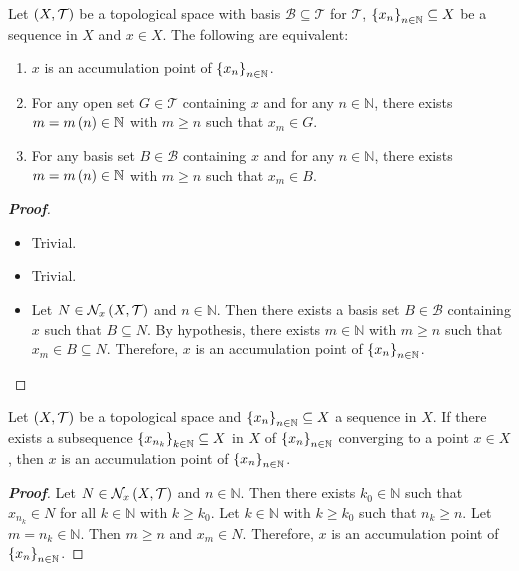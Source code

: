 \begin{proposition}
  Let $\left(X,\mathcal{T}\right)$ be a topological space with basis $\mathcal{B}\subseteq\mathcal{T}$ for $\mathcal{T}$, $\left\{x_n\right\}_{n\in\mathbb{N}}\subseteq X$ be a sequence in $X$ and $x\in X$. The following are equivalent:

  \begin{enumerate}
    \item $x$ is an accumulation point of $\left\{x_n\right\}_{n\in\mathbb{N}}$.
    \item For any open set $G\in\mathcal{T}$ containing $x$ and for any $n\in\mathbb{N}$, there exists $m=m\left(n\right)\in\mathbb{N}$ with $m\geq n$ such that $x_m\in G$.
    \item For any basis set $B\in\mathcal{B}$ containing $x$ and for any $n\in\mathbb{N}$, there exists $m=m\left(n\right)\in\mathbb{N}$ with $m\geq n$ such that $x_m\in B$.
  \end{enumerate}
  \begin{proof}[\rm\textbf{Proof}]
    \hfill
    \begin{itemize}
      \item[\boxed{1\Rightarrow2}] Trivial.
      \item[\boxed{2\Rightarrow3}] Trivial.
      \item[\boxed{3\Rightarrow1}] Let $N\in\mathcal{N}_x\left(X,\mathcal{T}\right)$ and $n\in\mathbb{N}$. Then there exists a basis set $B\in\mathcal{B}$ containing $x$ such that $B\subseteq N$. By hypothesis, there exists $m\in\mathbb{N}$ with $m\geq n$ such that $x_m\in B\subseteq N$. Therefore, $x$ is an accumulation point of $\left\{x_n\right\}_{n\in\mathbb{N}}$.
    \end{itemize}
  \end{proof}
\end{proposition}

\begin{proposition}
  Let $\left(X,\mathcal{T}\right)$ be a topological space and $\left\{x_n\right\}_{n\in\mathbb{N}}\subseteq X$ a sequence in $X$. If there exists a subsequence $\left\{x_{n_k}\right\}_{k\in\mathbb{N}}\subseteq X$ in $X$ of $\left\{x_n\right\}_{n\in\mathbb{N}}$ converging to a point $x\in X$, then $x$ is an accumulation point of $\left\{x_n\right\}_{n\in\mathbb{N}}$.

  \begin{proof}[\rm\textbf{Proof}]
    Let $N\in\mathcal{N}_x\left(X,\mathcal{T}\right)$ and $n\in\mathbb{N}$. Then there exists $k_0\in\mathbb{N}$ such that $x_{n_k}\in N$ for all $k\in\mathbb{N}$ with $k\geq k_0$. Let $k\in\mathbb{N}$ with $k\geq k_0$ such that $n_k\geq n$. Let $m=n_k\in\mathbb{N}$. Then $m\geq n$ and $x_m\in N$. Therefore, $x$ is an accumulation point of $\left\{x_n\right\}_{n\in\mathbb{N}}$.
  \end{proof}
\end{proposition}

